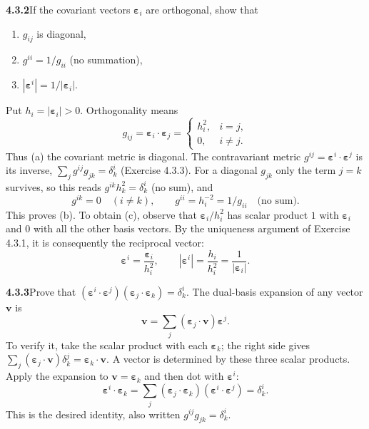 \par\bigskip
\noindent\textbf{4.3.2}\quad If the covariant vectors
$\boldsymbol{\varepsilon}_{i}$ are orthogonal, show that
\begin{enumerate}
\item[(a)] $g_{ij}$ is diagonal,
\item[(b)] $g^{ii}=1/g_{ii}$ (no summation),
\item[(c)] $|\boldsymbol{\varepsilon}^{i}|=1/|\boldsymbol{\varepsilon}_{i}|$.
\end{enumerate}
\solution
Put $h_i=|\boldsymbol\varepsilon_i|>0$. Orthogonality means
\[
g_{ij}=\boldsymbol\varepsilon_i\cdot\boldsymbol\varepsilon_j
=\begin{cases}h_i^2,&i=j,\\0,&i\ne j.\end{cases}
\]
Thus (a) the covariant metric is diagonal. The contravariant metric
$g^{ij}=\boldsymbol\varepsilon^i\cdot\boldsymbol\varepsilon^j$ is its
inverse, $\sum_jg^{ij}g_{jk}=\delta^i_k$ (Exercise 4.3.3). For a diagonal
$g_{jk}$ only the term $j=k$ survives, so this reads
$g^{ik}h_k^2=\delta^i_k$ (no sum), and
\[
g^{ik}=0\quad(i\ne k),\qquad
\boxed{g^{ii}=h_i^{-2}=1/g_{ii}}
\quad\text{(no sum)}.
\]
This proves (b). To obtain (c), observe that
$\boldsymbol\varepsilon_i/h_i^2$ has scalar product $1$ with
$\boldsymbol\varepsilon_i$ and $0$ with all the other basis vectors.
By the uniqueness argument of Exercise 4.3.1, it is consequently the
reciprocal vector:
\[
\boldsymbol\varepsilon^i
=\frac{\boldsymbol\varepsilon_i}{h_i^2},\qquad
\boxed{|\boldsymbol\varepsilon^i|
=\frac{h_i}{h_i^2}=\frac1{|\boldsymbol\varepsilon_i|}}.
\]

\par\bigskip
\noindent\textbf{4.3.3}\quad Prove that
$(\boldsymbol{\varepsilon}^{i}\cdot\boldsymbol{\varepsilon}^{j})
(\boldsymbol{\varepsilon}_{j}\cdot\boldsymbol{\varepsilon}_{k})
=\delta_{k}^{i}$.
\solution
The dual-basis expansion of any vector $\mathbf v$ is
\[
\mathbf v=\sum_j(\boldsymbol\varepsilon_j\cdot\mathbf v)
                  \boldsymbol\varepsilon^j.
\]
To verify it, take the scalar product with each
$\boldsymbol\varepsilon_k$; the right side gives
$\sum_j(\boldsymbol\varepsilon_j\cdot\mathbf v)\delta^j_k
=\boldsymbol\varepsilon_k\cdot\mathbf v$. A vector is determined by
these three scalar products. Apply the expansion to
$\mathbf v=\boldsymbol\varepsilon_k$ and then dot with
$\boldsymbol\varepsilon^i$:
\[
\boldsymbol\varepsilon^i\cdot\boldsymbol\varepsilon_k
=\sum_j(\boldsymbol\varepsilon_j\cdot\boldsymbol\varepsilon_k)
       (\boldsymbol\varepsilon^i\cdot\boldsymbol\varepsilon^j)
=\delta^i_k.
\]
This is the desired identity, also written $g^{ij}g_{jk}=\delta^i_k$.

